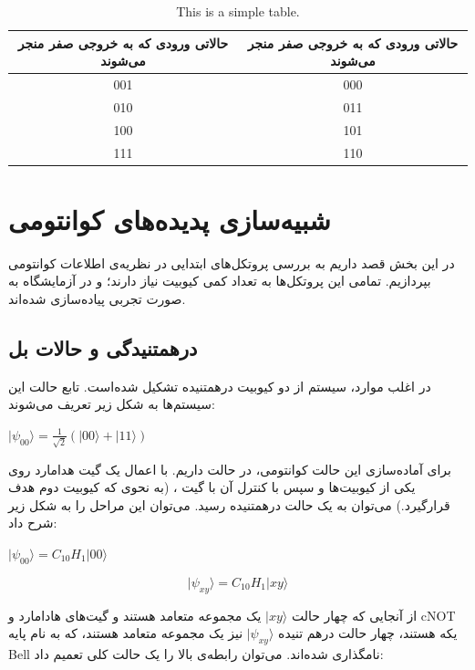 \documentclass{book}
\begin{document}
\begin{table}[h]
	\centering
	\begin{tabular}{|c|c|}
		\hline
		حالاتی ورودی که به خروجی صفر منجر می‌شوند &  حالاتی ورودی که به خروجی صفر منجر می‌شوند \\ \hline
		001 & 000 \\ \hline
		010 & 011 \\ \hline
		100 & 101 \\ \hline
		111 & 110 \\ \hline
	\end{tabular}
	\caption{This is a simple table.}
\end{table}





\chapter{شبیه‌سازی پدیده‌های کوانتومی}
در این بخش قصد داریم به بررسی پروتکل‌های ابتدایی در نظریه‌ی اطلاعات کوانتومی بپردازیم. تمامی این پروتکل‌ها به تعداد کمی کیوبیت نیاز دارند؛ و در آزمایشگاه به صورت تجربی پیاده‌سازی شده‌اند. 
\section{درهمتنیدگی و حالات بل}
در اغلب موارد، سیستم از دو کیوبیت درهمتنیده تشکیل شده‌است. تابع حالت این سیستم‌ها به شکل زیر تعریف می‌شوند:
\begin{center}
	$\vert \psi_{00} \rangle = \frac{1}{\sqrt{2}}(|00\rangle + |11\rangle)$
\end{center}
برای آماده‌سازی این حالت کوانتومی‌، در حالت  داریم. با اعمال یک گیت هدامارد روی یکی از کیوبیت‌ها و سپس با کنترل‌ آن با گیت ، (به نحوی که کیوبیت دوم هدف قرارگیرد.) می‌توان به یک حالت درهمتنیده رسید. می‌توان این مراحل را به شکل زیر شرح داد:
\begin{center}
	$\vert\psi_{00}\rangle = C_{10}H_{1}\vert00\rangle$
\end{center}

\[
\vert\psi_{xy}\rangle = C_{10}H_{1}\vert xy \rangle
\]

از آنجایی که چهار حالت $\vert xy\rangle$ یک مجموعه متعامد هستند و گیت‌های هادامارد و cNOT یکه هستند، چهار حالت درهم تنیده $\vert \psi_{xy}\rangle$ نیز یک مجموعه متعامد هستند، که به نام پایه Bell نامگذاری شده‌اند.  می‌توان رابطه‌ی بالا را یک حالت کلی تعمیم داد:
\end{document}
